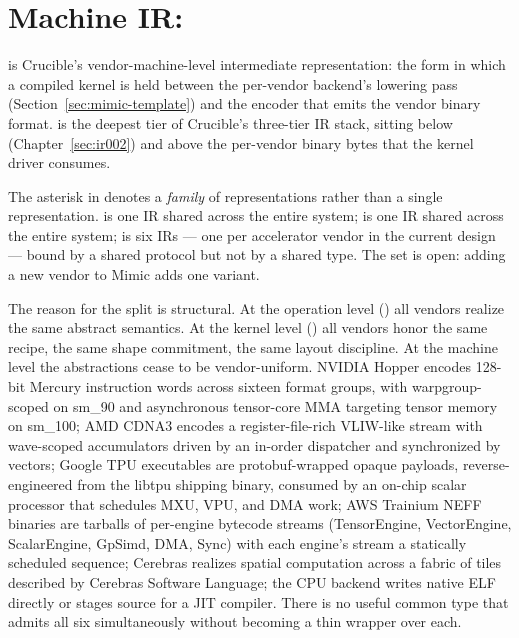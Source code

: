 
\section{Machine IR: }
\label{sec:ir003}

 is Crucible's vendor-machine-level intermediate representation: the form in which a compiled kernel is held between the per-vendor backend's lowering pass (Section~\ref{sec:mimic-template}) and the encoder that emits the vendor binary format.
 is the deepest tier of Crucible's three-tier IR stack, sitting below  (Chapter~\ref{sec:ir002}) and above the per-vendor binary bytes that the kernel driver consumes.

The asterisk in  denotes a \emph{family} of representations rather than a single representation.
 is one IR shared across the entire system;  is one IR shared across the entire system;  is six IRs --- one per accelerator vendor in the current design --- bound by a shared protocol but not by a shared type.
The set is open: adding a new vendor to Mimic adds one variant.

The reason for the split is structural.
At the operation level () all vendors realize the same abstract semantics.
At the kernel level () all vendors honor the same recipe, the same shape commitment, the same layout discipline.
At the machine level the abstractions cease to be vendor-uniform.
NVIDIA Hopper encodes 128-bit Mercury instruction words across sixteen format groups, with warpgroup-scoped  on sm\_90 and asynchronous tensor-core MMA targeting tensor memory on sm\_100; AMD CDNA3 encodes a register-file-rich VLIW-like stream with wave-scoped accumulators driven by an in-order dispatcher and synchronized by  vectors; Google TPU executables are protobuf-wrapped opaque payloads, reverse-engineered from the libtpu shipping binary, consumed by an on-chip scalar processor that schedules MXU, VPU, and DMA work; AWS Trainium NEFF binaries are tarballs of per-engine bytecode streams (TensorEngine, VectorEngine, ScalarEngine, GpSimd, DMA, Sync) with each engine's stream a statically scheduled sequence; Cerebras realizes spatial computation across a fabric of tiles described by Cerebras Software Language; the CPU backend writes native ELF directly or stages source for a JIT compiler.
There is no useful common type that admits all six simultaneously without becoming a thin wrapper over each.

